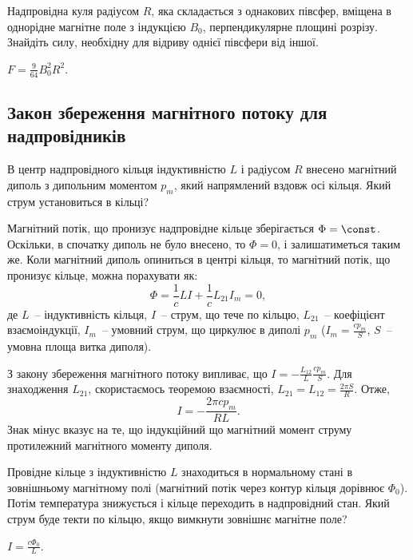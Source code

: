 \begin{problem}
Надпровідна куля радіусом $R$, яка складається з однакових півсфер, вміщена в однорідне магнітне поле з індукцією $B_0$, перпендикулярне площині розрізу. Знайдіть силу, необхідну для відриву однієї півсфери від іншої.
\begin{solution}
	$F  = \frac{9}{64}B_0^2R^2$.
\end{solution}
\end{problem}

\subsection*{Закон збереження магнітного потоку для надпровідників}


\begin{problem}
В центр надпровідного кільця індуктивністю $L$ і радіусом $R$ внесено магнітний диполь з дипольним моментом $p_m$, який напрямлений вздовж осі кільця. Який струм установиться в кільці?
\begin{solution}
	Магнітний потік, що пронизує надпровідне кільце зберігається $\Phi = \const$. Оскільки, в спочатку диполь не було внесено, то $\Phi = 0$, і залишатиметься таким же. Коли магнітний диполь опиниться в центрі кільця, то магнітний потік, що пронизує кільце, можна порахувати як:
	\[
		\Phi = \frac1c LI + \frac1c L_{21}I_m = 0,
	\]
	де $L$~-- індуктивність кільця, $I$~-- струм, що тече по кільцю, $L_{21}$~-- коефіцієнт взаємоіндукції, $I_m$~-- умовний струм, що циркулює в диполі $p_m$ ($I_m = \frac{cp_m}{S}$, $S$~-- умовна площа витка диполя).

	З закону збереження магнітного потоку випливає, що $I = - \frac{L_{12}}{L}\frac{cp_m}{S}$.
	Для знаходження $L_{21}$, скористаємось теоремою взаємності, $L_{21} = L_{12} = \frac{2\pi S}{R}$.
	Отже,
	\[
		I = - \frac{ 2\pi c p_m}{RL}.
	\]
	Знак мінус вказує на те, що індукційний що магнітний момент струму протилежний магнітного моменту диполя.
\end{solution}
\end{problem}


\begin{problem}
Провідне кільце з індуктивністю $L$ знаходиться в нормальному стані в зовнішньому магнітному полі (магнітний потік через контур кільця дорівнює $\Phi_0$). Потім температура знижується і кільце переходить в надпровідний стан. Який струм буде текти по кільцю, якщо вимкнути зовнішнє магнітне поле?
\begin{solution}
	$I = \frac{c\Phi_0}{L}$.
\end{solution}
\end{problem}

